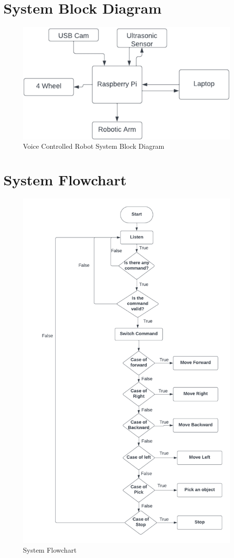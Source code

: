 \section{System Block Diagram}
\begin{figure}[h]
    \centering
    \includegraphics[width=1\linewidth]{systemBlockDiagram (1) (1).png}
    \caption{Voice Controlled Robot System Block Diagram}
    \label{fig:enter-label}
\end{figure}

\newpage
\section{System Flowchart}
\begin{figure}[h]
    \centering
    \includegraphics[width=0.7\linewidth]{systemFlowchart.png}
    \caption{System Flowchart}
    \label{fig:enter-label}
\end{figure}
\newpage
